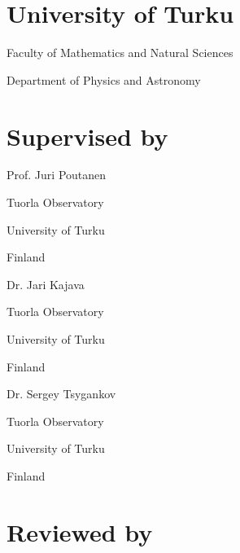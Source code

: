 \begin{titlepage}
\vspace{7cm}

\colorbox{black}{\begin{minipage}{15cm}
\begin{center}

    \phantom{bla}

    \large{}\selectfont\mbox{\color{white}{Turun yliopiston julkaisuja - Annales Universitatis Turkuensis }}
    \footnotesize{}\selectfont\mbox{\color{white}{Sarja - ser. A I osa - tom. 570 $\vert$ Astronomica - Chemica - Physica - Mathematica $\vert$ Turku 2017}}

    \phantom{bla}
\end{center}
\end{minipage}}
    


\end{titlepage}

\restoregeometry
\clearpage
\newpage


\setlength{\parindent}{0cm}
\section*{University of Turku}

Faculty of Mathematics and Natural Sciences

Department of Physics and Astronomy

\section*{Supervised by}

Prof. Juri Poutanen

Tuorla Observatory

University of Turku

Finland

\vspace{0.5cm}
Dr. Jari Kajava

Tuorla Observatory

University of Turku

Finland

\vspace{0.5cm}
Dr. Sergey Tsygankov

Tuorla Observatory

University of Turku

Finland


\section*{Reviewed by}

